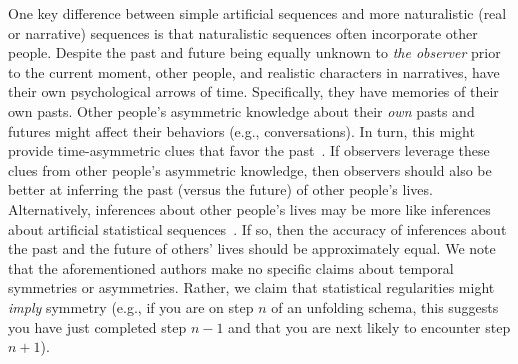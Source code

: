 \documentclass[10pt]{article}
\begin{document}
One key difference between simple artificial sequences and more naturalistic
(real or narrative) sequences is that naturalistic sequences often incorporate
other people. Despite the past and future being equally unknown to \textit{the
observer} prior to the current moment, other people, and realistic characters
in narratives, have their own psychological arrows of time. Specifically, they
have memories of their own pasts. Other people's asymmetric knowledge about
their \textit{own} pasts and futures might affect their behaviors (e.g.,
conversations). In turn, this might provide time-asymmetric clues that favor
the past~\citep[e.g., other people might talk more about their own pasts than
their futures; ][]{DemiEtal18}. If observers leverage these clues from other
people's asymmetric knowledge, then observers should also be better at
inferring the past (versus the future) of other people's lives. Alternatively,
inferences about other people's lives may be more like inferences about
artificial statistical sequences~\citep[e.g., perhaps solely relying on
statistical regularities like event schemas, scripts, or situation
models][]{RadvCope06, ZwaaRadv98, BoweEtal79, RangRitc12, BaldEtal18}. If so,
then the accuracy of inferences about the past and the future of others' lives
should be approximately equal. We note that the aforementioned authors make no
specific claims about temporal symmetries or asymmetries. Rather, we claim that
statistical regularities might \textit{imply} symmetry (e.g., if you are on
step $n$ of an unfolding schema, this suggests you have just completed step $n
- 1$ and that you are next likely to encounter step $n + 1$).
\end{document}
